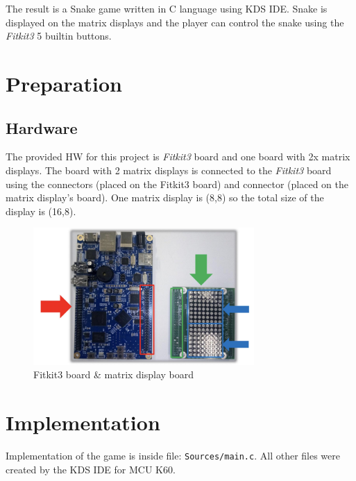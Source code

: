 \documentclass[a4paper, 11pt]{article}
\begin{document}
    The result is a Snake game written in C language using
    KDS IDE\cite{KDSIDE}.
    Snake is displayed on the matrix displays and the player can control
    the snake using the \textit{Fitkit3} 5 built\-in buttons.
    \newline





    \section{Preparation}\label{sec:preparation}


    \subsection{Hardware}\label{subsec:hardware}
    The provided HW for this project is \textit{Fitkit3} board and one
    board with 2x matrix displays.
    The board with 2 matrix displays is connected to the
    \textit{Fitkit3} board using the connectors
        {\color{Green}{P1}} (placed on the Fitkit3 board) and connector
        {\color{Red}{P3}} (placed on the matrix display's board).
    One matrix display is (8,8) so the total size of the display is (16,8).

    \begin{figure}[h]
        \centering
        \includegraphics[width=0.75\textwidth]{equipments}
        \caption{Fitkit3 board \& matrix display board}\label{fig:figure1}
    \end{figure}




    \section{Implementation}\label{sec:implementation}
    Implementation of the game is inside file: \texttt{Sources/main.c}.
    All other files were created by the KDS IDE for MCU K60.
\end{document}
